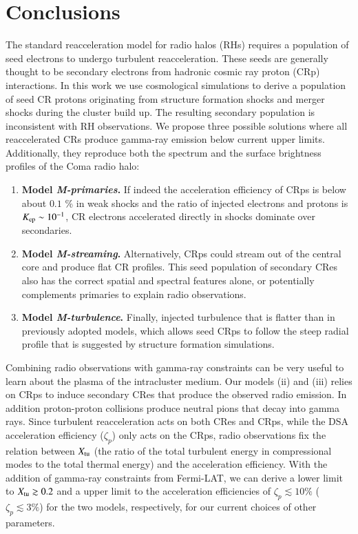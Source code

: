 \documentclass[fleqn,usenatbib,useAMS]{mnras}
\begin{document}
\section{Conclusions}
\label{sec:conclusions}

The standard reacceleration model for radio halos (RHs) requires a
population of seed electrons to undergo turbulent
reacceleration. These seeds are generally thought to be secondary
electrons from hadronic cosmic ray proton (CRp) interactions. In this
work we use cosmological simulations to derive a population of seed CR
protons originating from structure formation shocks and merger shocks
during the cluster build up. The resulting secondary population is
inconsistent with RH observations. We propose three possible solutions
where all reaccelerated CRs produce gamma-ray emission below current
upper limits. Additionally, they reproduce both the spectrum and the
surface brightness profiles of the Coma radio halo:

\begin{enumerate}
\item {\bf Model {\em M-primaries}.} If indeed the acceleration
  efficiency of CRps is below about $0.1$ {\%} in weak shocks and the
  ratio of injected electrons and protons is $K_{{\mathrm{ep}}} \sim
  10^{-1}$, CR electrons accelerated directly in shocks dominate over
  secondaries.
\item {\bf Model {\em M-streaming}.} Alternatively, CRps could stream
  out of the central core and produce flat CR profiles. This seed
  population of secondary CRes also has the correct spatial and
  spectral features alone, or potentially complements primaries to
  explain radio observations.
\item {\bf Model {\em M-turbulence}.}  Finally, injected turbulence
  that is flatter than in previously adopted models, which allows seed
  CRps to follow the steep radial profile that is suggested by
  structure formation simulations.
\end{enumerate}

Combining radio observations with gamma-ray constraints can be very
useful to learn about the plasma of the intracluster medium. Our
models (ii) and (iii) relies on CRps to induce secondary CRes that
produce the observed radio emission. In addition proton-proton
collisions produce neutral pions that decay into gamma rays. Since
turbulent reacceleration acts on both CRes and CRps, while the DSA
acceleration efficiency ($\zeta_p$) only acts on the CRps, radio
observations fix the relation between $X_{\mathrm{tu}}$ (the ratio of the
total turbulent energy in compressional modes to the total thermal
energy) and the acceleration efficiency. With the addition of
gamma-ray constraints from Fermi-LAT, we can derive a lower limit to
$X_{\mathrm{tu}}\gtrsim0.2$ and a upper limit to the acceleration
efficiencies of $\zeta_p\lesssim 10\%$ ($\zeta_p\lesssim 3\%$) for
the two models, respectively, for our current choices of other
parameters.
\end{document}
